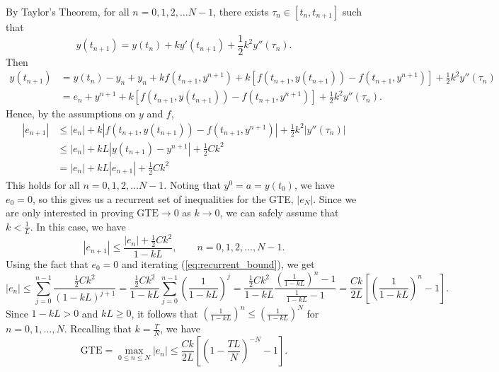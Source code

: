 \documentclass{homework}
\begin{document}
	By Taylor's Theorem, for all $n =0,1,2,\dots N-1$, there exists $\tau_n \in [t_n, t_{n+1}]$ such that
	\begin{equation*}
		y(t_{n+1}) = y(t_n) + ky'(t_{n+1}) + \frac{1}{2}k^2y''(\tau_n).
	\end{equation*}
	Then
	\begin{align*}
		y(t_{n+1}) &= y(t_n) - y_n + y_n + kf\left(t_{n+1}, y^{n+1}\right) + k\left[f(t_{n+1}, y(t_{n+1})) - f\left(t_{n+1}, y^{n+1}\right)\right] + \frac{1}{2}k^2y''(\tau_n) \\
		&= e_n + y^{n+1} +  k\left[f(t_{n+1}, y(t_{n+1})) - f\left(t_{n+1}, y^{n+1}\right)\right] + \frac{1}{2}k^2y''(\tau_n).
	\end{align*}
	Hence, by the assumptions on $y$ and $f$,
	\begin{align*}
		|e_{n+1}| &\le |e_n| +  k\left|f(t_{n+1}, y(t_{n+1})) - f\left(t_{n+1}, y^{n+1}\right)\right| + \frac{1}{2}k^2|y''(\tau_n)| \\
		&\le |e_n| + kL\left|y(t_{n+1}) - y^{n+1}\right| + \frac{1}{2}Ck^2 \\
		&= |e_n| + kL|e_{n+1}| + \frac{1}{2}Ck^2
	\end{align*}
	This holds for all $n = 0,1,2,\dots N-1$. Noting that $y^0 = a = y(t_0)$, we have $e_0 = 0$, so this gives us a recurrent set of inequalities for the GTE, $|e_N|$. Since we are only interested in proving $\text{GTE} \to 0$ as $k \to 0$, we can safely assume that $k < \frac{1}{L}$. In this case, we have
	\begin{equation}
		\label{eq:recurrent_bound}
		|e_{n+1}| \le \frac{|e_n| + \frac{1}{2}Ck^2}{1-kL}, \qquad n = 0,1,2,\dots, N-1.
	\end{equation}
	Using the fact that $e_0 = 0$ and iterating (\ref{eq:recurrent_bound}), we get
	\begin{equation*}
		|e_n| \le \sum_{j=0}^{n-1} \frac{\frac{1}{2}Ck^2}{(1-kL)^{j+1}} = \frac{\frac{1}{2}Ck^2}{1-kL}\sum_{j=0}^{n-1}\left(\frac{1}{1-kL}\right)^j = \frac{\frac{1}{2}Ck^2}{1-kL}\frac{ \left(\frac{1}{1-kL}\right)^n - 1}{\frac{1}{1-kL} - 1} = \frac{Ck}{2L}\left[\left(\frac{1}{1-kL}\right)^n -1\right].
	\end{equation*}
	Since $1-kL > 0$ and $kL \ge 0$, it follows that $\left(\frac{1}{1-kL}\right)^n \le \left(\frac{1}{1-kL}\right)^N$ for $n = 0,1,\dots, N$. Recalling that $k = \frac{T}{N}$, we have
	\begin{equation*}
		\text{GTE} = \max_{0\le n\le N}|e_n| \le \frac{Ck}{2L}\left[\left(1 - \frac{TL}{N}\right)^{-N} - 1\right].
	\end{equation*}
\end{document}
